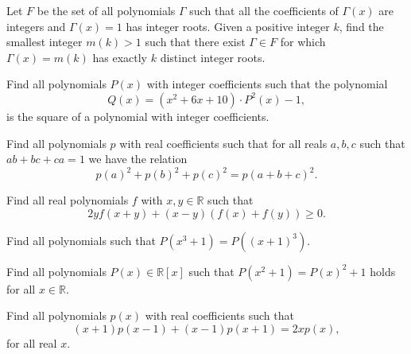 \begin{question}
Let $F$ be the set of all polynomials $\Gamma$ such that all the coefficients of $\Gamma (x)$ are integers and $\Gamma (x) = 1$ has integer roots. Given a positive integer $k$, find the smallest integer $m(k) > 1$ such that there exist $\Gamma \in F$ for which $\Gamma (x) = m(k)$ has exactly $k$ distinct integer roots.
\end{question}





\begin{question}
Find all polynomials $P(x)$ with integer coefficients such that the polynomial \[ Q(x)=(x^2+6x+10) \cdot P^2(x)-1, \] is the square of a polynomial with integer coefficients.
\end{question}





\begin{question}
Find all polynomials $p$ with real coefficients such that for all reals $a, b ,c$ such that $ab+bc+ca =1$ we have the relation \[p(a)^{2}+p(b)^{2}+p(c)^{2}=p(a+b+c)^{2}.\]
\end{question}





\begin{question}
Find all real polynomials $ f$ with $ x,y \in \mathbb{R}$ such that
\[ 2 y f(x + y) + (x - y)(f(x) + f(y)) \geq 0.\]
\end{question}





\begin{question}
Find all polynomials such that $P(x^3+1) = P((x+1)^3)$.
\end{question}








\begin{question}
Find all polynomials $P(x) \in \mathbb{R}[x]$ such that $P(x^2+1)=P(x)^2+1$ holds for all $x \in \mathbb{R}$.
\end{question}





\begin{question}
Find all polynomials $p(x)$ with real coefficients such that
\[ (x+1)p(x-1) + (x-1)p(x+1) = 2x p(x),  \]
for all real $x$.
\end{question}





